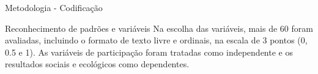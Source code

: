 \begin{frame}{Metodologia - Codificação}

\begin{block}{Reconhecimento de padrões e variáveis}
Na escolha das variáveis, mais de 60 foram avaliadas, incluindo o formato de texto livre e ordinais, na escala de 3 pontos (0, 0.5 e 1). As variáveis de participação foram tratadas como independente e os resultados sociais e ecológicos como dependentes.
\end{block}
\end{frame}